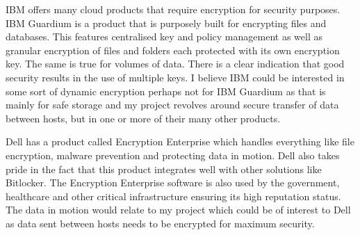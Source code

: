 IBM offers many cloud products that require encryption for security purposes. IBM Guardium \cite{IBM_Guardium} is a product that is purposely built for encrypting files and databases. This features centralised key and policy management as well as granular encryption of files and folders each protected with its own encryption key. The same is true for volumes of data. There is a clear indication that good security results in the use of multiple keys. I believe IBM could be interested in some sort of dynamic encryption perhaps not for IBM Guardium as that is mainly for safe storage and my project revolves around secure transfer of data between hosts, but in one or more of their many other products.

Dell has a product called Encryption Enterprise \cite{Dell_Encryption_Enterprise} which handles everything like file encryption, malware prevention and protecting data in motion. Dell also takes pride in the fact that this product integrates well with other solutions like Bitlocker. The Encryption Enterprise software is also used by the government, healthcare and other critical infrastructure ensuring its high reputation status. The data in motion would relate to my project which could be of interest to Dell as data sent between hosts needs to be encrypted for maximum security. 
%
%
%
%